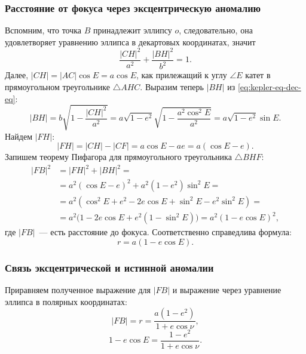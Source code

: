 \subsubsection*{Расстояние от фокуса через эксцентрическую аномалию}
Вспомним, что точка $B$ принадлежит эллипсу $o$, следовательно, она удовлетворяет уравнению эллипса в декартовых координатах, значит
\begin{equation}
    \frac{|CH|^2}{a^2} + \frac{|BH|^2}{b^2} = 1.
    \label{eq:kepler-eq-dec-eq}
\end{equation}
Далее, $|CH| = |AC| \cos E = a \cos E$, как прилежащий к углу $\angle E$ катет в прямоугольном треугольнике $\triangle AHC$. Выразим теперь $|BH|$ из \eqref{eq:kepler-eq-dec-eq}:
\begin{equation*}
    |BH| = b\sqrt{1 - \frac{|CH|^2}{a^2}} = a \sqrt{1 - e^2} \sqrt{1 - \frac{a^2 \cos^2 E}{a^2}} = a \sqrt{1 - e^2} \sin E .
\end{equation*}
Найдем $|FH|$:
\begin{equation*}
    |FH| = |CH| - |CF| = a \cos E - a e = a (\cos E - e).
\end{equation*}
Запишем теорему Пифагора для прямоугольного треугольника $\triangle BHF$:
\begin{align*}
    |FB|^2 &= |FH|^2 + |BH|^2 = \\
    &= a^2 (\cos E - e)^2 + a^2 \left( 1 - e^2 \right) \sin^2 E = \\
    &= a^2 \left( \cos^2 E + e^2 - 2 e \cos E + \sin^2 E - e^2 \sin^2 E \right) = \\
    &= a^2 \Big( 1 - 2 e \cos E + e^2 \left( 1 - \sin^2 E \right) \Big) =  a^2 \left( 1 - e \cos E \right)^2,
\end{align*}
где $|FB|$~--- есть расстояние до фокуса. Соответственно справедлива формула:
\begin{equation}
	r = a (1 - e \cos E).
	\label{eq:kepler-eq-r-E}
\end{equation}
\subsubsection*{Связь эксцентрической и истинной аномалии}
Приравняем полученное выражение для $|FB|$ и выражение через уравнение эллипса в полярных координатах:
\begin{equation*}
    |FB| = r = \frac{a \left(1 - e^2 \right)}{ 1 + e \cos \nu},
\end{equation*}
\begin{equation}
    1 - e \cos E  = \frac{1 - e^2}{ 1 + e \cos \nu}.
    \label{eq:kepler-eq-E-nu-1}
\end{equation}

